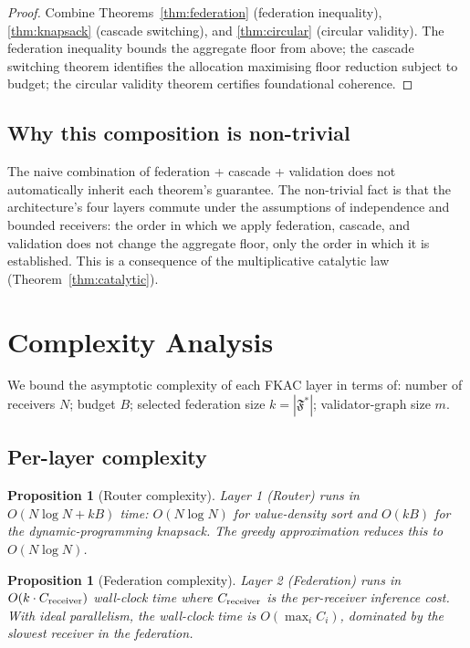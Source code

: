 \documentclass[11pt,twocolumn,a4paper]{article}
\newtheorem{proposition}[theorem]{Proposition}
\theoremstyle{definition}
\theoremstyle{remark}
\newcommand{\Federation}{\mathfrak{F}}
\begin{document}
\begin{proof}
Combine Theorems~\ref{thm:federation} (federation inequality), \ref{thm:knapsack} (cascade switching), and \ref{thm:circular} (circular validity). The federation inequality bounds the aggregate floor from above; the cascade switching theorem identifies the allocation maximising floor reduction subject to budget; the circular validity theorem certifies foundational coherence.
\end{proof}

\subsection{Why this composition is non-trivial}

The naive combination of federation + cascade + validation does not automatically inherit each theorem's guarantee. The non-trivial fact is that the architecture's four layers commute under the assumptions of independence and bounded receivers: the order in which we apply federation, cascade, and validation does not change the aggregate floor, only the order in which it is established. This is a consequence of the multiplicative catalytic law (Theorem~\ref{thm:catalytic}).


\section{Complexity Analysis}
\label{sec:complexity}

We bound the asymptotic complexity of each FKAC layer in terms of: number of receivers $N$; budget $B$; selected federation size $k = |\Federation^*|$; validator-graph size $m$.

\subsection{Per-layer complexity}

\begin{proposition}[Router complexity]
\label{prop:router-comp}
Layer 1 (Router) runs in $O(N \log N + k B)$ time: $O(N \log N)$ for value-density sort and $O(k B)$ for the dynamic-programming knapsack. The greedy approximation reduces this to $O(N \log N)$.
\end{proposition}

\begin{proposition}[Federation complexity]
\label{prop:fed-comp}
Layer 2 (Federation) runs in $O(k \cdot C_{\rm receiver})$ wall-clock time where $C_{\rm receiver}$ is the per-receiver inference cost. With ideal parallelism, the wall-clock time is $O(\max_i C_i)$, dominated by the slowest receiver in the federation.
\end{proposition}
\end{document}
